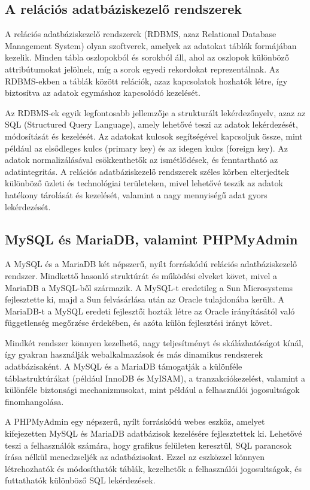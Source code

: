 \documentclass[colorlinks]{thesis-kando}
\theoremstyle{definition}
\theoremstyle{remark}
\begin{document}
\subsection{A relációs adatbáziskezelő rendszerek}

A relációs adatbáziskezelő rendszerek (RDBMS, azaz Relational Database Management System) olyan szoftverek, amelyek az adatokat táblák formájában kezelik. Minden tábla oszlopokból és sorokból áll, ahol az oszlopok különböző attribútumokat jelölnek, míg a sorok egyedi rekordokat reprezentálnak. Az RDBMS-ekben a táblák között relációk, azaz kapcsolatok hozhatók létre, így biztosítva az adatok egymáshoz kapcsolódó kezelését.

Az RDBMS-ek egyik legfontosabb jellemzője a strukturált lekérdezőnyelv, azaz az SQL (Structured Query Language), amely lehetővé teszi az adatok lekérdezését, módosítását és kezelését. Az adatokat kulcsok segítségével kapcsoljuk össze, mint például az elsődleges kulcs (primary key) és az idegen kulcs (foreign key). Az adatok normalizálásával csökkenthetők az ismétlődések, és fenntartható az adatintegritás. A relációs adatbáziskezelő rendszerek széles körben elterjedtek különböző üzleti és technológiai területeken, mivel lehetővé teszik az adatok hatékony tárolását és kezelését, valamint a nagy mennyiségű adat gyors lekérdezését.
\pagebreak
\subsection{MySQL és MariaDB, valamint PHPMyAdmin}

A MySQL és a MariaDB két népszerű, nyílt forráskódú relációs adatbáziskezelő rendszer. Mindkettő hasonló struktúrát és működési elveket követ, mivel a MariaDB a MySQL-ből származik. A MySQL-t eredetileg a Sun Microsystems fejlesztette ki, majd a Sun felvásárlása után az Oracle tulajdonába került. A MariaDB-t a MySQL eredeti fejlesztői hozták létre az Oracle irányításától való függetlenség megőrzése érdekében, és azóta külön fejlesztési irányt követ.

Mindkét rendszer könnyen kezelhető, nagy teljesítményt és skálázhatóságot kínál, így gyakran használják webalkalmazások és más dinamikus rendszerek adatbázisaként. A MySQL és a MariaDB támogatják a különféle táblastruktúrákat (például InnoDB és MyISAM), a tranzakciókezelést, valamint a különféle biztonsági mechanizmusokat, mint például a felhasználói jogosultságok finomhangolása.

A PHPMyAdmin egy népszerű, nyílt forráskódú webes eszköz, amelyet kifejezetten MySQL és MariaDB adatbázisok kezelésére fejlesztettek ki. Lehetővé teszi a felhasználók számára, hogy grafikus felületen keresztül, SQL parancsok írása nélkül menedzseljék az adatbázisokat. Ezzel az eszközzel könnyen létrehozhatók és módosíthatók táblák, kezelhetők a felhasználói jogosultságok, és futtathatók különböző SQL lekérdezések.
\end{document}
